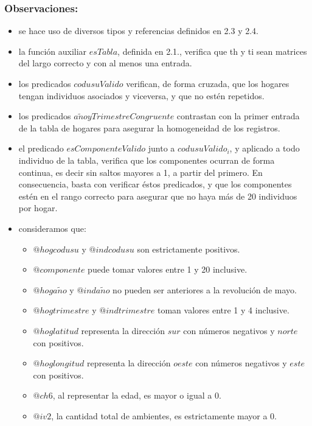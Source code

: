     \subsubsection{Observaciones:}
        \begin{itemize}
            \item se hace uso de diversos tipos y referencias definidos en 2.3 y 2.4.
            \item la funci\'on auxiliar $esTabla$, definida en 2.1., verifica que th y ti sean matrices del largo correcto y 
            con al menos una entrada.
            \item los predicados $codusuValido$ verifican, de forma cruzada, que los hogares tengan individuos asociados y viceversa, 
            y que no est\'en repetidos.    
            \item los predicados $a\tilde{n}oyTrimestreCongruente$ contrastan con la primer entrada de la tabla de hogares para asegurar
            la homogeneidad de los registros. 
            \item el predicado $esComponenteValido$ junto a $codusuValido_{i}$, y aplicado a todo individuo de la tabla, verifica que los 
            componentes ocurran de forma continua, es decir sin saltos mayores a 1, a partir del primero. 
            En consecuencia, basta con verificar \'estos predicados, y que los componentes est\'en en el rango correcto para asegurar 
            que no haya m\'as de 20 individuos por hogar. 
            \item consideramos que: 
                \begin{itemize}
                    \item $@hogcodusu$ y $@indcodusu$ son estrictamente positivos.
                    \item $@componente$ puede tomar valores entre 1 y 20 inclusive.
                    \item $@hoga\tilde{n}o$ y $@inda\tilde{n}o$ no pueden ser anteriores a la revoluci\'on de mayo.
                    \item $@hogtrimestre$ y $@indtrimestre$ toman valores entre 1 y 4 inclusive.
                    \item $@hoglatitud$ representa la direcci\'on $sur$ con n\'umeros negativos y $norte$ con positivos.
                    \item $@hoglongitud$ representa la direcci\'on $oeste$ con n\'umeros negativos y $este$ con positivos.
                    \item $@ch6$, al representar la edad, es mayor o igual a 0.
                    \item $@iv2$, la cantidad total de ambientes, es estrictamente mayor a 0.
                \end{itemize}
        \end{itemize}